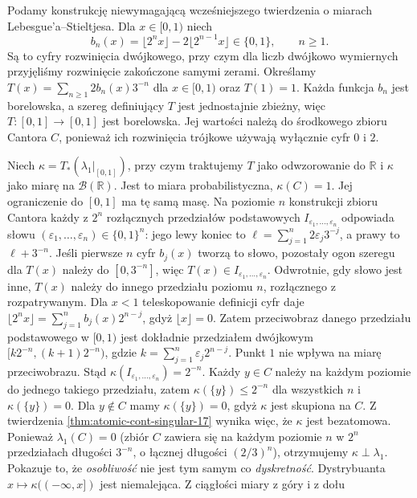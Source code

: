 \begin{przyklad}
\label{ex:cantor-measure-17}
Podamy konstrukcję niewymagającą wcześniejszego twierdzenia
o miarach Lebesgue'a--Stieltjesa. Dla $x\in[0,1)$ niech
\[
b_n(x)=\lfloor2^nx\rfloor-2\lfloor2^{n-1}x\rfloor\in\{0,1\},
\qquad n\ge1.
\]
Są to cyfry rozwinięcia dwójkowego, przy czym dla liczb
dwójkowo wymiernych przyjęliśmy rozwinięcie zakończone
samymi zerami. Określamy
$T(x)=\sum_{n\ge1}2b_n(x)3^{-n}$ dla $x\in[0,1)$
oraz $T(1)=1$. Każda funkcja $b_n$ jest borelowska,
a szereg definiujący $T$ jest jednostajnie zbieżny,
więc $T:[0,1]\to[0,1]$ jest borelowska. Jej wartości
należą do środkowego zbioru Cantora $C$, ponieważ ich
rozwinięcia trójkowe używają wyłącznie cyfr $0$ i $2$.

Niech $\kappa=T_*(\lambda_1|_{[0,1]})$, przy czym traktujemy
$T$ jako odwzorowanie do $\mathbb R$ i $\kappa$ jako miarę
na $\mathcal B(\mathbb R)$. Jest to miara probabilistyczna,
$\kappa(C)=1$. Jej ograniczenie do $[0,1]$ ma tę samą masę. Na poziomie $n$ konstrukcji zbioru Cantora
każdy z $2^n$ rozłącznych przedziałów podstawowych
$I_{\varepsilon_1,\ldots,\varepsilon_n}$ odpowiada
słowu $(\varepsilon_1,\ldots,\varepsilon_n)\in\{0,1\}^n$:
jego lewy koniec to $\ell=\sum_{j=1}^n2\varepsilon_j3^{-j}$,
a prawy to $\ell+3^{-n}$. Jeśli pierwsze $n$ cyfr
$b_j(x)$ tworzą to słowo, pozostały ogon szeregu dla
$T(x)$ należy do $[0,3^{-n}]$, więc $T(x)\in
I_{\varepsilon_1,\ldots,\varepsilon_n}$. Odwrotnie,
gdy słowo jest inne, $T(x)$ należy do innego przedziału
poziomu $n$, rozłącznego z rozpatrywanym.
Dla $x<1$ teleskopowanie definicji cyfr daje
$\lfloor2^nx\rfloor=\sum_{j=1}^n b_j(x)2^{n-j}$,
gdyż $\lfloor x\rfloor=0$.
Zatem przeciwobraz danego przedziału podstawowego
w $[0,1)$ jest dokładnie przedziałem dwójkowym
$[k2^{-n},(k+1)2^{-n})$, gdzie
$k=\sum_{j=1}^n\varepsilon_j2^{n-j}$.
Punkt $1$ nie wpływa na miarę przeciwobrazu. Stąd
$\kappa(I_{\varepsilon_1,\ldots,\varepsilon_n})=2^{-n}$.
Każdy $y\in C$ należy na każdym poziomie do jednego
takiego przedziału, zatem
$\kappa(\{y\})\le2^{-n}$ dla wszystkich $n$ i
$\kappa(\{y\})=0$. Dla $y\notin C$ mamy
$\kappa(\{y\})=0$, gdyż $\kappa$ jest skupiona na $C$.
Z twierdzenia \ref{thm:atomic-cont-singular-17} wynika więc, że $\kappa$ jest bezatomowa. Ponieważ
$\lambda_1(C)=0$ (zbiór $C$ zawiera się na każdym poziomie $n$ w $2^n$ przedziałach długości $3^{-n}$, o łącznej długości $(2/3)^n$), otrzymujemy $\kappa\perp\lambda_1$.
Pokazuje to, że \emph{osobliwość} nie jest tym samym co
\emph{dyskretność}. Dystrybuanta $x\mapsto\kappa((-\infty,x])$ jest niemalejąca. Z ciągłości miary z góry i z dołu

\end{przyklad}
